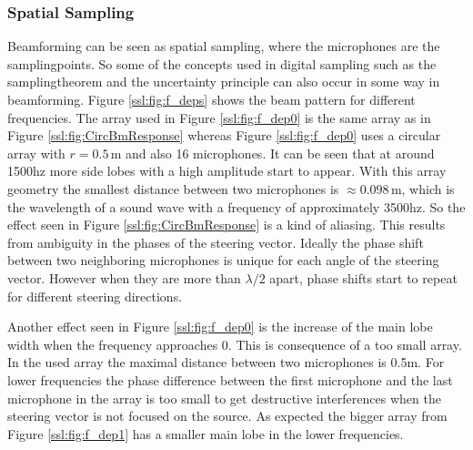 \subsubsection{Spatial Sampling}
\label{sec:spatSam}
Beamforming can be seen as spatial sampling, where the microphones
are the samplingpoints.
So some of the concepts used in digital sampling such as
the samplingtheorem and the uncertainty principle can also
occur in some way in beamforming.
Figure \ref{ssl:fig:f_deps} shows the beam pattern for different frequencies.
The array used in Figure \ref{ssl:fig:f_dep0} is the same array
as in Figure \ref{ssl:fig:CircBmResponse} whereas Figure \ref{ssl:fig:f_dep0}
uses a circular array with $r = 0.5$\,m and also 16 microphones.
It can be seen that at around 1500hz more side lobes with a
high amplitude start to appear.
With this array geometry the smallest distance between two
microphones is $\approx 0.098$\,m, which is the wavelength
of a sound wave with a frequency of approximately 3500hz.
So the effect seen in Figure \ref{ssl:fig:CircBmResponse} is
a kind of aliasing.
This results from ambiguity in the phases of the steering vector.
Ideally the phase shift between two neighboring microphones is unique
for each angle of the steering vector.
However when they are more than $\lambda/2$ apart, phase shifts start to
repeat for different steering directions.

Another effect seen in Figure \ref{ssl:fig:f_dep0} is the increase
of the main lobe width when the frequency approaches 0.
This is consequence of a too small array.
In the used array the maximal distance between two microphones is 0.5m.
For lower frequencies the phase difference between the first microphone and
the last microphone in the array is too small to get destructive
interferences when the steering vector is not focused on the source.
As expected the bigger array from Figure \ref{ssl:fig:f_dep1} has a smaller
main lobe in the lower frequencies.

